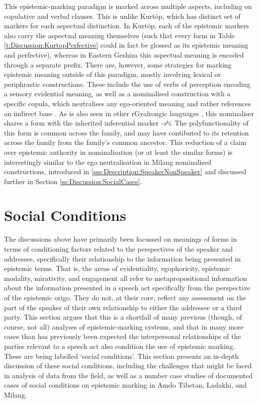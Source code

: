 This epistemic-marking paradigm is marked across multiple aspects, including on copulative and verbal clauses. This is unlike Kurtöp, which has distinct set of markers for each aspectual distinction. In Kurtöp, each of the epistemic markers also carry the aspectual meaning themselves (such that every form in Table \ref{t:Discussion:KurtopPerfective} could in fact be glossed as its epistemic meaning and perfective), whereas in Eastern Geshiza this aspectual meaning is encoded through a separate prefix. There are, however, some strategies for marking epistemic meaning outside of this paradigm, mostly involving lexical or periphrastic constructions. These include the use of verbs of perception encoding a sensory evidential meaning, as well as a nominalised construction with a specific copula, which neutralises any ego-oriented meaning and rather references an indirect base \cite[596]{Honkasalo2019}. As is also seen in other rGyalrongic languages \cites{Lai2017}{Gates2021}{Zhang2022}, this nominaliser shares a form with the inherited inferential marker \textit{-sʰi}. The polyfunctionality of this form is common across the family, and may have contibuted to its retention across the family from the family's common ancestor. This reduction of a claim over epistemic authority in nominalisation (or at least the similar forms) is interestingly similar to the ego neutralisation in Milang nominalised constructions, introduced in \ref{sss:Description:SpeakerNonSpeaker} and discussed further in Section \ref{ss:Discussion:SocialCases}.


\section{Social Conditions}\label{s:Discussion:Social}
The discussions above have primarily been focussed on meanings of forms in terms of conditioning factors related to the perspectives of the speaker and addressee, specifically their relationship to the information being presented in epistemic terms. That is, the areas of evidentiality, egophoricity, epistemic modality, mirativity, and engagement all refer to metapropositional information about the information presented in a speech act specifically from the perspective of the epistemic origo. They do not, at their core, reflect any assessment on the part of the speaker of their own relationship to either the addressee or a third party. This section argues that this is a shortfall of many previous (though, of course, not all) analyses of epistemic-marking systems, and that in many more cases than has previously been expected the interpersonal relationships of the parties relevant to a speech act also condition the use of epistemic marking. These are being labelled `social conditions'. This section presents an in-depth discussion of these social conditions, including the challenges that might be faced in analysis of data from the field, as well as a number case studies of documented cases of social conditions on epistemic marking in Amdo Tibetan, Ladakhi, and Milang.

